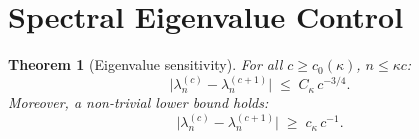\documentclass[12pt,a4paper]{amsart}
\newtheorem{theorem}{Theorem}[section]
\theoremstyle{definition}
\theoremstyle{remark}
\begin{document}
\section{Spectral Eigenvalue Control}
\label{sec:spectral}

\begin{theorem}[Eigenvalue sensitivity]
\label{thm:spectral}
For all $c \ge c_0(\kappa)$, $n \le \kappa c$:
\begin{equation}\label{eq:spectral-upper}
  \bigl|\lambda_n^{(c)} - \lambda_n^{(c+1)}\bigr|
  \;\le\; C_\kappa\, c^{-3/4}.
\end{equation}
Moreover, a non-trivial lower bound holds:
\begin{equation}\label{eq:spectral-lower-weak}
  \bigl|\lambda_n^{(c)} - \lambda_n^{(c+1)}\bigr|
  \;\ge\; c_\kappa\, c^{-1}.
\end{equation}
\end{theorem}
\end{document}
